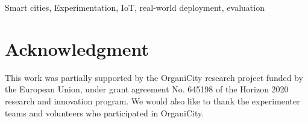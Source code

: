 \documentclass[journal]{IEEEtran}
\begin{document}
\begin{IEEEkeywords}
Smart cities, Experimentation, IoT, real-world deployment, evaluation
\end{IEEEkeywords}

\IEEEpeerreviewmaketitle







\section*{Acknowledgment}
This work was partially supported by the OrganiCity research project funded by the European Union, under grant agreement No. 645198 of the Horizon 2020 research and innovation program. We would also like to thank the experimenter teams and volunteers who participated in OrganiCity.
\end{document}
